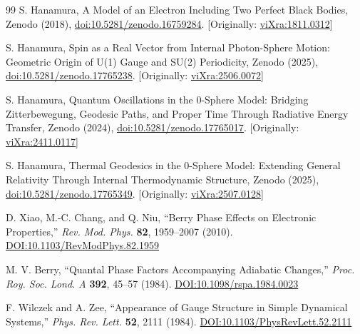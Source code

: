 \documentclass[%
 reprint,
 amsmath,amssymb,
 aps,
]{revtex4-1}
\numberwithin{equation}{section}%
\begin{document}
\begin{thebibliography}{99}
S. Hanamura, A Model of an Electron Including Two Perfect Black Bodies, Zenodo (2018), \href{https://doi.org/10.5281/zenodo.16759284}{doi:10.5281/zenodo.16759284}. [Originally: \href{https://vixra.org/abs/1811.0312}{viXra:1811.0312}]

S. Hanamura, Spin as a Real Vector from Internal Photon-Sphere Motion: Geometric Origin of U(1) Gauge and SU(2) Periodicity, Zenodo (2025), \href{https://doi.org/10.5281/zenodo.17765238}{doi:10.5281/zenodo.17765238}. [Originally: \href{https://vixra.org/abs/2506.0072}{viXra:2506.0072}]

S. Hanamura, Quantum Oscillations in the 0-Sphere Model: Bridging Zitterbewegung, Geodesic Paths, and Proper Time Through Radiative Energy Transfer, Zenodo (2024), \href{https://doi.org/10.5281/zenodo.17765017}{doi:10.5281/zenodo.17765017}. [Originally: \href{https://vixra.org/abs/2411.0117}{viXra:2411.0117}]

S. Hanamura, Thermal Geodesics in the 0-Sphere Model: Extending General Relativity Through Internal Thermodynamic Structure, Zenodo (2025), \href{https://doi.org/10.5281/zenodo.17765349}{doi:10.5281/zenodo.17765349}. [Originally: \href{https://vixra.org/abs/2507.0128}{viXra:2507.0128}]

D. Xiao, M.-C. Chang, and Q. Niu, ``Berry Phase Effects on Electronic Properties,'' \textit{Rev. Mod. Phys.} \textbf{82}, 1959–2007 (2010). \href{https://doi.org/10.1103/RevModPhys.82.1959}{DOI:10.1103/RevModPhys.82.1959}

M. V. Berry, ``Quantal Phase Factors Accompanying Adiabatic Changes,'' \textit{Proc. Roy. Soc. Lond. A} \textbf{392}, 45–57 (1984). \href{https://doi.org/10.1098/rspa.1984.0023}{DOI:10.1098/rspa.1984.0023}

F. Wilczek and A. Zee, ``Appearance of Gauge Structure in Simple Dynamical Systems,'' \textit{Phys. Rev. Lett.} \textbf{52}, 2111 (1984). \href{https://doi.org/10.1103/PhysRevLett.52.2111}{DOI:10.1103/PhysRevLett.52.2111}


\end{thebibliography}
\end{document}
